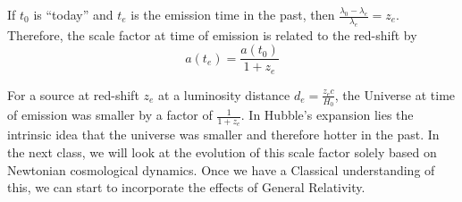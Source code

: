 \documentclass[a4paper,twoside,master.tex]{subfiles}
\begin{document}
If $ t_0 $ is ``today'' and $ t_e $ is the emission time in the past, then $ \frac{\lambda_0 - \lambda_e}{\lambda_e} = z_e $. Therefore, the scale factor at time of emission is related to the red-shift by
\begin{equation}
    a(t_e) = \frac{a(t_0)}{1 + z_e}
\end{equation}

For a source at red-shift $ z_e $ at a luminosity distance $ d_e = \frac{z_e c}{H_0} $, the Universe at time of emission was smaller by a factor of $ \frac{1}{1 + z_e} $. In Hubble's expansion lies the intrinsic idea that the universe was smaller and therefore hotter in the past. In the next class, we will look at the evolution of this scale factor solely based on Newtonian cosmological dynamics. Once we have a Classical understanding of this, we can start to incorporate the effects of General Relativity.
\end{document}
